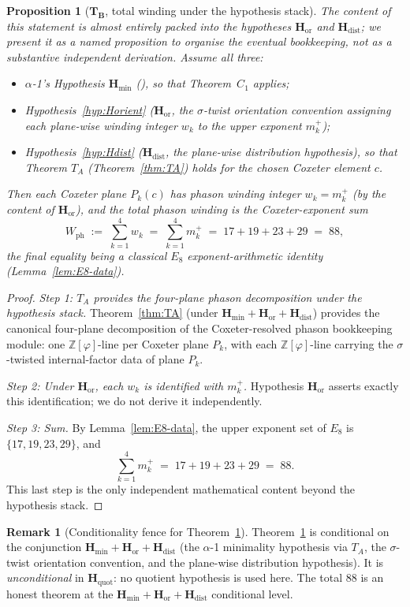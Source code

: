 \documentclass[11pt, a4paper]{amsart}
\newtheorem{proposition}[theorem]{Proposition}
\theoremstyle{definition}
\newtheorem{remark}[theorem]{Remark}
\newcommand{\Hmin}{\mathbf{H}_{\min}}
\newcommand{\Hor}{\mathbf{H}_{\mathrm{or}}}
\newcommand{\Hdist}{\mathbf{H}_{\mathrm{dist}}}
\newcommand{\Hquot}{\mathbf{H}_{\mathrm{quot}}}
\newcommand{\Ophi}{\mathbb{Z}[\varphi]}
\newcommand{\Wph}{W_{\mathrm{ph}}}
\begin{document}
\begin{proposition}[$\mathbf{T_B}$, total winding under the hypothesis stack]
\label{thm:TB-88}
\emph{The content of this statement is almost entirely packed
into the hypotheses $\Hor$ and $\Hdist$; we present it as a
named proposition to organise the eventual bookkeeping, not as
a substantive independent derivation.} Assume all three:
\begin{itemize}
\item $\alpha$-1's Hypothesis $\Hmin$
  (\cite{Cascade12D}), so that Theorem~$C_1$ applies;
\item Hypothesis~\ref{hyp:Horient} ($\Hor$, the
  $\sigma$-twist orientation convention assigning each plane-wise
  winding integer $w_k$ to the upper exponent $m_k^+$);
\item Hypothesis~\ref{hyp:Hdist} ($\Hdist$, the plane-wise
  distribution hypothesis), so that Theorem $T_A$
  (Theorem~\ref{thm:TA}) holds for the chosen Coxeter element
  $c$.
\end{itemize}
Then each Coxeter plane $P_k(c)$ has phason winding integer
$w_k = m_k^+$ (\emph{by the content of} $\Hor$), and the total
phason winding is the Coxeter-exponent sum
\[
  \Wph \;:=\; \sum_{k=1}^{4} w_k
       \;=\; \sum_{k=1}^{4} m_k^+
       \;=\; 17 + 19 + 23 + 29
       \;=\; 88,
\]
the final equality being a classical $E_8$ exponent-arithmetic
identity (Lemma~\ref{lem:E8-data}).
\end{proposition}

\begin{proof}
\emph{Step 1: $T_A$ provides the four-plane phason
decomposition under the hypothesis stack.}
Theorem~\ref{thm:TA} (under $\Hmin + \Hor + \Hdist$) provides
the canonical four-plane decomposition of the Coxeter-resolved
phason bookkeeping module: one $\Ophi$-line per Coxeter plane
$P_k$, with each $\Ophi$-line carrying the $\sigma$-twisted
internal-factor data of plane $P_k$.

\emph{Step 2: Under $\Hor$, each $w_k$ is identified with $m_k^+$.}
Hypothesis $\Hor$ asserts exactly this identification; we do not
derive it independently.

\emph{Step 3: Sum.} By Lemma~\ref{lem:E8-data}, the upper
exponent set of $E_8$ is $\{17, 19, 23, 29\}$, and
\[
  \sum_{k=1}^{4} m_k^+ \;=\; 17 + 19 + 23 + 29 \;=\; 88.
\]
This last step is the only independent mathematical content
beyond the hypothesis stack.
\end{proof}

\begin{remark}[Conditionality fence for Theorem~\ref{thm:TB-88}]
\label{rmk:TB-88-fence}
Theorem~\ref{thm:TB-88} is conditional on the conjunction
$\Hmin + \Hor + \Hdist$ (the $\alpha$-1 minimality
hypothesis via $T_A$, the $\sigma$-twist orientation
convention, and the plane-wise distribution hypothesis). It
is \emph{unconditional} in $\Hquot$: no quotient hypothesis
is used here. The total $88$ is an honest theorem at the
$\Hmin + \Hor + \Hdist$ conditional level.
\end{remark}
\end{document}
